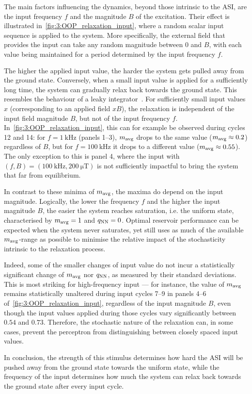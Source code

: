 The main factors influencing the dynamics, beyond those intrinsic to the ASI, are the input frequency $f$ and the magnitude $B$ of the excitation.
Their effect is illustrated in~\cref{fig:3:OOP_relaxation_input}, where a random scalar input sequence is applied to the system.
More specifically, the external field that provides the input can take any random magnitude between 0 and $B$, with each value being maintained for a period determined by the input frequency $f$. \par %
The higher the applied input value, the harder the system gets pulled away from the ground state.
Conversely, when a small input value is applied for a sufficiently long time, the system can gradually relax back towards the ground state.
This resembles the behaviour of a leaky integrator~\cite{jaeger2001echo}.
For sufficiently small input values $x$ (corresponding to an applied field $xB$), the relaxation is independent of the input field magnitude $B$, but not of the input frequency $f$.
In~\cref{fig:3:OOP_relaxation_input}, this can for example be observed during cycles 12 and 14: for $f=\SI{1}{\kilo\hertz}$ (panels 1--3), $m_\mathrm{avg}$ drops to the same value ($m_\mathrm{avg} \approx 0.2$) regardless of $B$, but for $f=\SI{100}{\kilo\hertz}$ it drops to a different value ($m_\mathrm{avg} \approx 0.55$).
The only exception to this is panel 4, where the input with $(f,B)=(\SI{100}{\kilo\hertz}, \SI{200}{\micro\tesla})$ is not sufficiently impactful to bring the system that far from equilibrium. \par
In contrast to these minima of $m_\mathrm{avg}$, the maxima do depend on the input magnitude.
Logically, the lower the frequency $f$ and the higher the input magnitude $B$, the easier the system reaches saturation, i.e. the uniform state, characterised by $m_\mathrm{avg}=1$ and $q_\mathrm{NN}=0$.
Optimal reservoir performance can be expected when the system never saturates, yet still uses as much of the available $m_\mathrm{avg}$-range as possible to minimise the relative impact of the stochasticity intrinsic to the relaxation process. \par
Indeed, some of the smaller changes of input value do not incur a statistically significant change of $m_\mathrm{avg}$ nor $q_\mathrm{NN}$, as measured by their standard deviations.
This is most striking for high-frequency input --- for instance, the value of $m_\mathrm{avg}$ remains statistically unaltered during input cycles 7--9 in panels 4--6 of~\cref{fig:3:OOP_relaxation_input}, regardless of the input magnitude $B$, even though the input values applied during those cycles vary significantly between $0.54$ and $0.73$.
Therefore, the stochastic nature of the relaxation can, in some cases, prevent the perceptron from distinguishing between closely spaced input values. \par
In conclusion, the strength of this stimulus determines how hard the ASI will be pushed away from the ground state towards the uniform state, while the frequency of the input determines how much the system can relax back towards the ground state after every input cycle.

